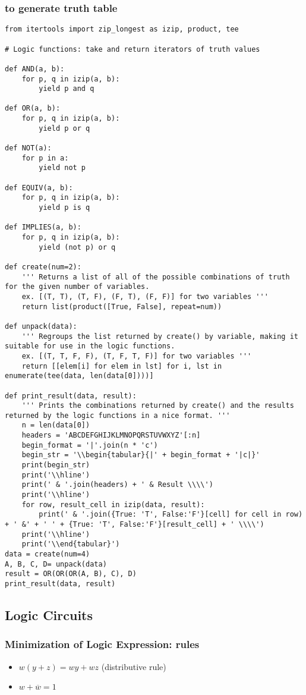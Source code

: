 \documentclass[11pt]{article}
\begin{document}
\subsubsection{to generate truth table}
\label{sec:org44654ed}
\begin{verbatim}
from itertools import zip_longest as izip, product, tee

# Logic functions: take and return iterators of truth values

def AND(a, b):
    for p, q in izip(a, b):
        yield p and q

def OR(a, b):
    for p, q in izip(a, b):
        yield p or q

def NOT(a):
    for p in a:
        yield not p

def EQUIV(a, b):
    for p, q in izip(a, b):
        yield p is q

def IMPLIES(a, b):
    for p, q in izip(a, b):
        yield (not p) or q

def create(num=2):
    ''' Returns a list of all of the possible combinations of truth for the given number of variables.
    ex. [(T, T), (T, F), (F, T), (F, F)] for two variables '''
    return list(product([True, False], repeat=num))

def unpack(data):
    ''' Regroups the list returned by create() by variable, making it suitable for use in the logic functions.
    ex. [(T, T, F, F), (T, F, T, F)] for two variables '''
    return [[elem[i] for elem in lst] for i, lst in enumerate(tee(data, len(data[0])))]

def print_result(data, result):
    ''' Prints the combinations returned by create() and the results returned by the logic functions in a nice format. '''
    n = len(data[0])
    headers = 'ABCDEFGHIJKLMNOPQRSTUVWXYZ'[:n]
    begin_format = '|'.join(n * 'c')
    begin_str = '\\begin{tabular}{|' + begin_format + '|c|}'
    print(begin_str)
    print('\\hline')
    print(' & '.join(headers) + ' & Result \\\\')
    print('\\hline')
    for row, result_cell in izip(data, result):
        print(' & '.join({True: 'T', False:'F'}[cell] for cell in row) + ' &' + ' ' + {True: 'T', False:'F'}[result_cell] + ' \\\\')
    print('\\hline')
    print('\\end{tabular}')
data = create(num=4)
A, B, C, D= unpack(data)
result = OR(OR(OR(A, B), C), D)
print_result(data, result)
\end{verbatim}
\subsection{Logic Circuits}
\label{sec:orgd226282}
\subsubsection{Minimization of Logic Expression: rules}
\label{sec:org2e5d079}
\begin{itemize}
\item \(w(y + z) = wy + wz\)   (distributive rule)
\item \(w + \overline{w} = 1\)
\end{itemize}
\end{document}
